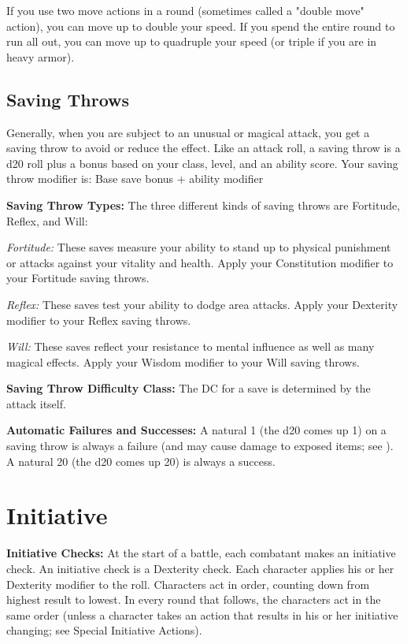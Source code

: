 If you use two move actions in a round (sometimes called a "double move" action), 
you can move up to double your speed. If you spend the entire round to run all 
out, you can move up to quadruple your speed (or triple if you are in heavy armor).

\subsection{Saving Throws}

Generally, when you are subject to an unusual or magical attack, you get a saving 
throw to avoid or reduce the effect. Like an attack roll, a saving throw is a d20 
roll plus a bonus based on your class, level, and an ability score. Your saving 
throw modifier is: Base save bonus + ability modifier 

\textbf{Saving Throw Types:} The three different kinds of saving throws are Fortitude, 
Reflex, and Will:

\textit{Fortitude:} These saves measure your ability to stand up to physical punishment 
or attacks against your vitality and health. Apply your Constitution modifier to 
your Fortitude saving throws. 

\textit{Reflex:} These saves test your ability to dodge area attacks. Apply your 
Dexterity modifier to your Reflex saving throws. 

\textit{Will:} These saves reflect your resistance to mental influence as well 
as many magical effects. Apply your Wisdom modifier to your Will saving throws.

\textbf{Saving Throw Difficulty Class:} The DC for a save is determined by the 
attack itself.

\textbf{Automatic Failures and Successes:} A natural 1 (the d20 comes up 1) on 
a saving throw is always a failure (and may cause damage to exposed items; see 
). A natural 20 (the d20 comes up 20) is always 
a success.

\section{Initiative}

\textbf{Initiative Checks:} At the start of a battle, each combatant makes an initiative 
check. An initiative check is a Dexterity check. Each character applies his or 
her Dexterity modifier to the roll. Characters act in order, counting down from 
highest result to lowest. In every round that follows, the characters act in the 
same order (unless a character takes an action that results in his or her initiative 
changing; see Special Initiative Actions).

